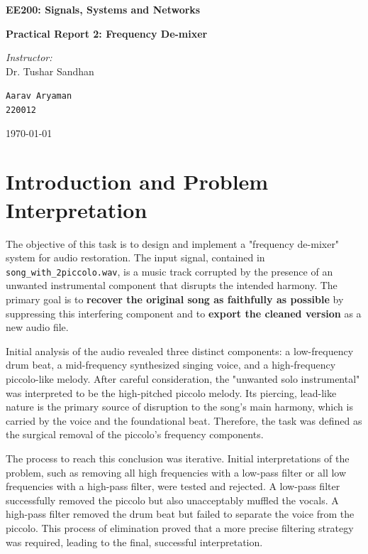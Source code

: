 \documentclass[11pt, a4paper]{article}
\begin{document}
\begin{titlepage}
    \centering
    \vspace*{\fill}
    {\Huge\bfseries EE200: Signals, Systems and Networks\par}
    \vspace{1.5cm}
    {\Large\bfseries Practical Report 2: Frequency De-mixer\par}
    \vspace{2cm}
    
    \large\emph{Instructor:}\\ Dr. Tushar Sandhan
        
    \vfill
    {\large \texttt{Aarav Aryaman} \\ \texttt{220012}}\par
    \vspace*{1cm}
    {\large \today\par}
\end{titlepage}

\tableofcontents
\newpage

\section{Introduction and Problem Interpretation}
The objective of this task is to design and implement a "frequency de-mixer" system for audio restoration. The input signal, contained in \texttt{song\_with\_2piccolo.wav}, is a music track corrupted by the presence of an unwanted instrumental component that disrupts the intended harmony. The primary goal is to \textbf{recover the original song as faithfully as possible} by suppressing this interfering component and to \textbf{export the cleaned version} as a new audio file.

Initial analysis of the audio revealed three distinct components: a low-frequency drum beat, a mid-frequency synthesized singing voice, and a high-frequency piccolo-like melody. After careful consideration, the "unwanted solo instrumental" was interpreted to be the high-pitched piccolo melody. Its piercing, lead-like nature is the primary source of disruption to the song's main harmony, which is carried by the voice and the foundational beat. Therefore, the task was defined as the surgical removal of the piccolo's frequency components.

The process to reach this conclusion was iterative. Initial interpretations of the problem, such as removing all high frequencies with a low-pass filter or all low frequencies with a high-pass filter, were tested and rejected. A low-pass filter successfully removed the piccolo but also unacceptably muffled the vocals. A high-pass filter removed the drum beat but failed to separate the voice from the piccolo. This process of elimination proved that a more precise filtering strategy was required, leading to the final, successful interpretation.
\end{document}

